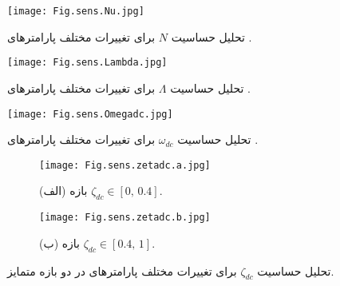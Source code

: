 \begin{figure}[htbp]
  \centering
  \texttt{[image: Fig.sens.Nu.jpg]}
  \caption{تحلیل حساسیت $N$ برای تغییرات مختلف پارامترهای .}
  \label{fig:N_sens}
\end{figure}

\begin{figure}[htbp]
  \centering
  \texttt{[image: Fig.sens.Lambda.jpg]}
  \caption{تحلیل حساسیت $\Lambda$ برای تغییرات مختلف پارامترهای .}
  \label{fig:Lambda_sens}
\end{figure}

\begin{figure}[htbp]
  \centering
  \texttt{[image: Fig.sens.Omegadc.jpg]}
  \caption{تحلیل حساسیت $\omega_{dc}$ برای تغییرات مختلف پارامترهای .}
  \label{fig:omega_dc_sens}
\end{figure}

\begin{figure}[htbp]
  \centering
  \begin{subfigure}[t]{\linewidth}
    \centering
    \texttt{[image: Fig.sens.zetadc.a.jpg]}
    \caption{(الف) بازه $\zeta_{dc}\in[0,\,0.4]$.}
    \label{subfig:zeta_dc_a}
  \end{subfigure}\vfill
  \begin{subfigure}[t]{\linewidth}
    \centering
    \texttt{[image: Fig.sens.zetadc.b.jpg]}
    \caption{(ب) بازه $\zeta_{dc}\in[0.4,\,1]$.}
    \label{subfig:zeta_dc_b}
  \end{subfigure}
  \caption{تحلیل حساسیت $\zeta_{dc}$ برای تغییرات مختلف پارامترهای  در دو بازه متمایز.}
  \label{fig:zeta_ranges}
\end{figure}
